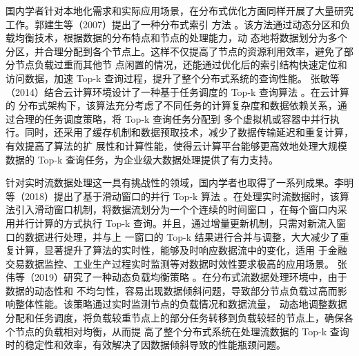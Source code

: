
国内学者针对本地化需求和实际应用场景，在分布式优化方面同样开展了大量研究工作。郭建生等（2007）提出了一种分布式索引
方法 \cite {guo2007}。该方法通过动态分区和负载均衡技术，根据数据的分布特点和节点的处理能力，动
态地将数据划分为多个分区，并合理分配到各个节点上。这样不仅提高了节点的资源利用效率，避免了部分节点负载过重而其他节
点闲置的情况，还能通过优化后的索引结构快速定位和访问数据，加速 Top-k 查询过程，提升了整个分布式系统的查询性能。
张敏等（2014）结合云计算环境设计了一种基于任务调度的 Top-k 查询算法 \cite {zhang2014}。在云计算的
分布式架构下，该算法充分考虑了不同任务的计算复杂度和数据依赖关系，通过合理的任务调度策略，将 Top-k 查询任务分配到
多个虚拟机或容器中并行执行。同时，还采用了缓存机制和数据预取技术，减少了数据传输延迟和重复计算，有效提高了算法的扩
展性和计算性能，使得云计算平台能够更高效地处理大规模数据的 Top-k 查询任务，为企业级大数据处理提供了有力支持。

针对实时流数据处理这一具有挑战性的领域，国内学者也取得了一系列成果。李明等（2018）提出了基于滑动窗口的并行 Top-k
 算法 \cite {li2018}。在处理实时流数据时，该算法引入滑动窗口机制，将数据流划分为一个个连续的时间窗口
 ，在每个窗口内采用并行计算的方式执行 Top-k 查询。并且，通过增量更新机制，只需对新流入窗口的数据进行处理，并与上
 一窗口的 Top-k 结果进行合并与调整，大大减少了重复计算，显著提升了算法的实时性，能够及时响应数据流中的变化，适用
 于金融交易数据监控、工业生产过程实时监测等对数据时效性要求极高的应用场景。
张伟等（2019）研究了一种动态负载均衡策略 \cite {zhang2019}。在分布式流数据处理环境中，由于数据的动态性和
不均匀性，容易出现数据倾斜问题，导致部分节点负载过高而影响整体性能。该策略通过实时监测节点的负载情况和数据流量，
动态地调整数据分配和任务调度，将负载较重节点上的部分任务转移到负载较轻的节点上，确保各个节点的负载相对均衡，从而提
高了整个分布式系统在处理流数据的 Top-k 查询时的稳定性和效率，有效解决了因数据倾斜导致的性能瓶颈问题。

